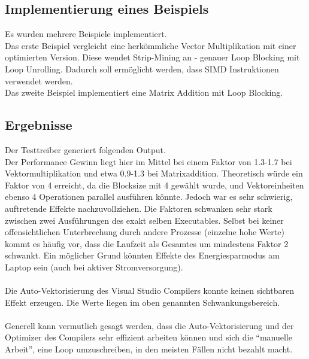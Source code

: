 
\subsection{Implementierung eines Beispiels}

Es wurden mehrere Beispiele implementiert. \\
Das erste Beispiel vergleicht eine herkömmliche Vector Multiplikation mit einer optimierten Version. Diese wendet Strip-Mining an - genauer Loop Blocking mit Loop Unrolling. Dadurch soll ermöglicht werden, dass SIMD Instruktionen verwendet werden.\\


Das zweite Beispiel implementiert eine Matrix Addition mit Loop Blocking.\\



\subsection{Ergebnisse}

Der Testtreiber generiert folgenden Output.\\


Der Performance Gewinn liegt hier im Mittel bei einem Faktor von 1.3-1.7 bei Vektormultiplikation und etwa 0.9-1.3 bei Matrixaddition. Theoretisch würde ein Faktor von 4 erreicht, da die Blocksize mit 4 gewählt wurde, und Vektoreinheiten ebenso 4 Operationen parallel ausführen könnte. Jedoch war es sehr schwierig, auftretende Effekte nachzuvollziehen. Die Faktoren schwanken sehr stark zwischen zwei Ausführungen des exakt selben Executables. Selbst bei keiner offensichtlichen Unterbrechung durch andere Prozesse (einzelne hohe Werte) kommt es häufig vor, dass die Laufzeit als Gesamtes um mindestens Faktor 2 schwankt. Ein möglicher Grund könnten Effekte des Energiesparmodus am Laptop sein (auch bei aktiver Stromversorgung).\\
\\
Die Auto-Vektorisierung des Visual Studio Compilers konnte keinen sichtbaren Effekt erzeugen. Die Werte liegen im oben genannten Schwankungsbereich.\\
\\
Generell kann vermutlich gesagt werden, dass die Auto-Vektorisierung und der Optimizer des Compilers sehr effizient arbeiten können und sich die ``manuelle Arbeit'', eine Loop umzuschreiben, in den meisten Fällen nicht bezahlt macht. \\
\\

